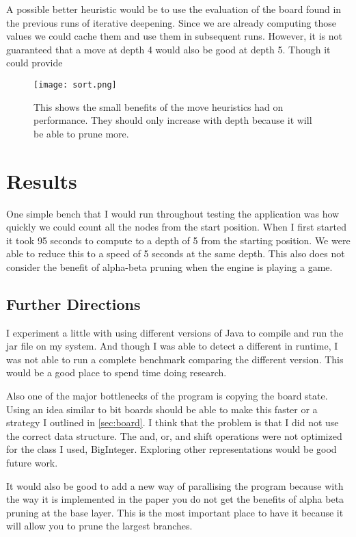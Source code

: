 \documentclass[sigconf]{acmart}
\begin{document}
A possible better heuristic would be to use the evaluation of the board found in the previous runs of iterative deepening.
Since we are already computing those values we could cache them and use them in subsequent runs.
However, it is not guaranteed that a move at depth 4 would also be good at depth 5.
Though it could provide

 \begin{figure}[H]
     \centering
     \texttt{[image: sort.png]}
     \caption{This shows the small benefits of the move heuristics had on performance. They should only increase with depth because it will be able to prune more.}
     \label{fig:enter-label}
 \end{figure}
\section{Results}
One simple bench that I would run throughout testing the application was how quickly we could count all the nodes from the start position.
When I first started it took 95 seconds to compute to a depth of 5 from the starting position.
We were able to reduce this to a speed of 5 seconds at the same depth.
This also does not consider the benefit of alpha-beta pruning when the engine is playing a game.

\subsection{Further Directions}
I experiment a little with using different versions of Java to compile and run the jar file on my system.
And though I was able to detect a different in runtime, I was not able to run a complete benchmark comparing the different version.
This would be a good place to spend time doing research.

Also one of the major bottlenecks of the program is copying the board state.
Using an idea similar to bit boards should be able to make this faster or a strategy I outlined in \ref{sec:board}.
I think that the problem is that I did not use the correct data structure.
The and, or, and shift operations were not optimized for the class I used, BigInteger.
Exploring other representations would be good future work.

It would also be good to add a new way of parallising the program because with the way it is implemented in the paper you do not get the benefits of alpha beta pruning at the base layer.
This is the most important place to have it because it will allow you to prune the largest branches.
\end{document}

